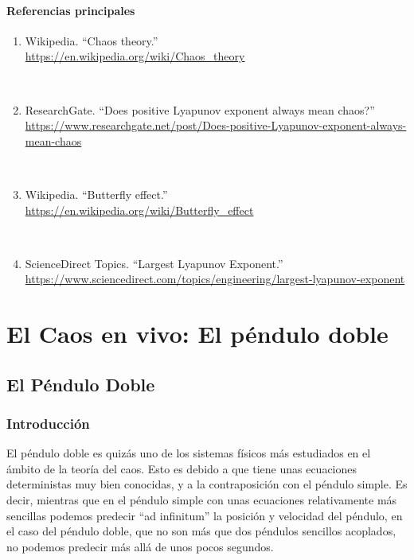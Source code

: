 \documentclass[
  10pt,
  a4paper,
  DIV=11,
  numbers=noendperiod,
  open=any]{scrreprt}
\providecommand{\tightlist}{%
  \setlength{\itemsep}{0pt}\setlength{\parskip}{0pt}}
\numberwithin{equation}{chapter}
\numberwithin{equation}{section}
\renewcommand{\[}{\begin{equation}}
\renewcommand{\]}{\end{equation}}
\begin{document}
\subsection{Referencias principales}\label{referencias-principales}

\begin{enumerate}
\def\labelenumi{\arabic{enumi}.}
\tightlist
\item
  Wikipedia. ``Chaos theory.''\\
  \url{https://en.wikipedia.org/wiki/Chaos_theory}\strut \\
\item
  ResearchGate. ``Does positive Lyapunov exponent always mean chaos?''\\
  \url{https://www.researchgate.net/post/Does-positive-Lyapunov-exponent-always-mean-chaos}\strut \\
\item
  Wikipedia. ``Butterfly effect.''\\
  \url{https://en.wikipedia.org/wiki/Butterfly_effect}\strut \\
\item
  ScienceDirect Topics. ``Largest Lyapunov Exponent.''\\
  \url{https://www.sciencedirect.com/topics/engineering/largest-lyapunov-exponent}
\end{enumerate}

\part{El Caos en vivo: El péndulo doble}

\chapter{El Péndulo Doble}\label{el-puxe9ndulo-doble}

\section{Introducción}\label{introducciuxf3n-3}

El péndulo doble es quizás uno de los sistemas físicos más estudiados en
el ámbito de la teoría del caos. Esto es debido a que tiene unas
ecuaciones deterministas muy bien conocidas, y a la contraposición con
el péndulo simple. Es decir, mientras que en el péndulo simple con unas
ecuaciones relativamente más sencillas podemos predecir ``ad infinitum''
la posición y velocidad del péndulo, en el caso del péndulo doble, que
no son más que dos péndulos sencillos acoplados, no podemos predecir más
allá de unos pocos segundos.
\end{document}
